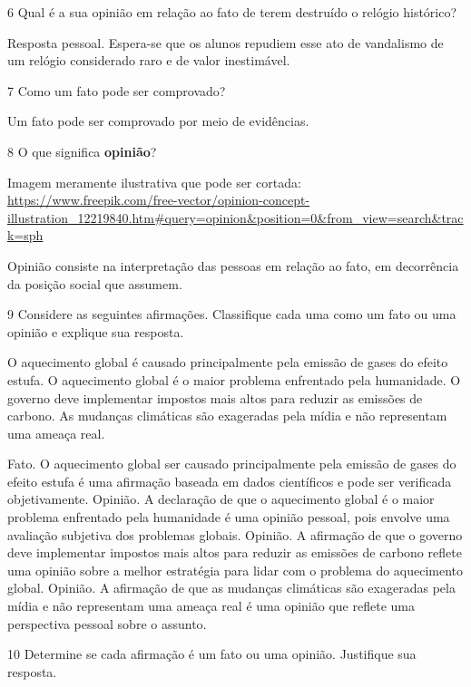\begin{itemize}
\begin{itemize}
\num{6} Qual é a sua opinião em relação ao fato de terem destruído o
relógio histórico?


Resposta pessoal. Espera-se que os alunos repudiem esse ato de
vandalismo de um relógio considerado raro e de valor inestimável.

\num{7} Como um fato pode ser comprovado?


Um fato pode ser comprovado por meio de evidências.

\num{8} O que significa \textbf{opinião}?

Imagem meramente ilustrativa que pode ser cortada:
\url{https://www.freepik.com/free-vector/opinion-concept-illustration_12219840.htm\#query=opinion\&position=0\&from_view=search\&track=sph}


Opinião consiste na interpretação das pessoas em relação ao fato, em
decorrência da posição social que assumem.

\num{9} Considere as seguintes afirmações. Classifique cada uma como um
fato ou uma opinião e explique sua resposta.

O aquecimento global é causado principalmente pela emissão de gases do
efeito estufa. O aquecimento global é o maior problema enfrentado pela
humanidade. O governo deve implementar impostos mais altos para reduzir
as emissões de carbono. As mudanças climáticas são exageradas pela mídia
e não representam uma ameaça real.


Fato. O aquecimento global ser causado principalmente pela emissão de
gases do efeito estufa é uma afirmação baseada em dados científicos e
pode ser verificada objetivamente. Opinião. A declaração de que o
aquecimento global é o maior problema enfrentado pela humanidade é uma
opinião pessoal, pois envolve uma avaliação subjetiva dos problemas
globais. Opinião. A afirmação de que o governo deve implementar impostos
mais altos para reduzir as emissões de carbono reflete uma opinião sobre
a melhor estratégia para lidar com o problema do aquecimento global.
Opinião. A afirmação de que as mudanças climáticas são exageradas pela
mídia e não representam uma ameaça real é uma opinião que reflete uma
perspectiva pessoal sobre o assunto.

\num{10} Determine se cada afirmação é um fato ou uma opinião.
Justifique sua resposta.


\end{itemize}
\end{itemize}
